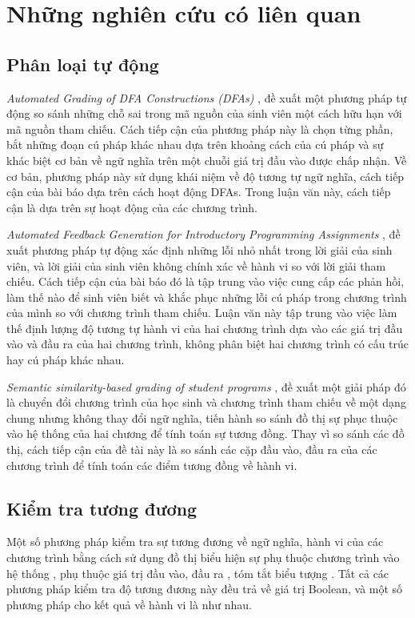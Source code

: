 \section{Những nghiên cứu có liên quan}

	\subsection*{Phân loại tự động}
	
	\textit{Automated Grading of DFA Constructions (DFAs)} \cite{alur2013automated}, đề xuất một phương pháp tự động so sánh những chỗ sai trong mã nguồn của sinh viên một cách hữu hạn với mã nguồn tham chiếu. Cách tiếp cận của phương pháp này là chọn từng phần, bắt những đoạn cú pháp khác nhau dựa trên khoảng cách của cú pháp và sự khác biệt cơ bản về ngữ nghĩa trên một chuỗi giá trị đầu vào được chấp nhận. Về cơ bản, phương pháp này sử dụng khái niệm về độ tương tự ngữ nghĩa, cách tiếp cận của bài báo dựa trên cách hoạt động DFAs. Trong luận văn này, cách tiếp cận là dựa trên sự hoạt động của các chương trình.
	
	\textit{Automated Feedback Generation for Introductory Programming Assignments} \cite{singh2013automated}, đề xuất phương pháp tự động xác định những lỗi nhỏ nhất trong lời giải của sinh viên, và lời giải của sinh viên không chính xác về hành vi so với lời giải tham chiếu. Cách tiếp cận của bài báo đó là tập trung vào việc cung cấp các phản hồi, làm thế nào để sinh viên biết và khắc phục những lỗi cú pháp trong chương trình của mình so với chương trình tham chiếu. Luận văn này tập trung vào việc làm thế định lượng độ tương tự hành vi của hai chương trình dựa vào các giá trị đầu vào và đầu ra của hai chương trình, không phân biệt hai chương trình có cấu trúc hay cú pháp khác nhau.

	\textit{Semantic similarity-based grading of student programs} \cite{wang2007semantic}, đề xuất một giải pháp đó là chuyển đổi chương trình của học sinh và chương trình tham chiếu về một dạng chung nhưng không thay đổi ngữ nghĩa, tiến hành so sánh đồ thị sự phục thuộc vào hệ thống của hai chương để tính toán sự tương đồng. Thay vì so sánh các đồ thị, cách tiếp cận của đề tài này là so sánh các cặp đầu vào, đầu ra của các chương trình để tính toán các điểm tương đồng về hành vi. 
	
	\subsection*{Kiểm tra tương đương}
	Một số phương pháp kiểm tra sự tương đương về ngữ nghĩa, hành vi của các chương trình bằng cách sử dụng đồ thị biểu hiện sự phụ thuộc chương trình vào hệ thống \cite{bates1993incremental} \cite{binkley1992using}, phụ thuộc giá trị đầu vào, đầu ra \cite{jackson1994semantic}, tóm tắt biểu tượng \cite{person2008differential}. Tất cả các phương pháp kiểm tra độ tương đương này đều trả về giá trị Boolean, và một số phương pháp cho kết quả về hành vi là như nhau. 
	
